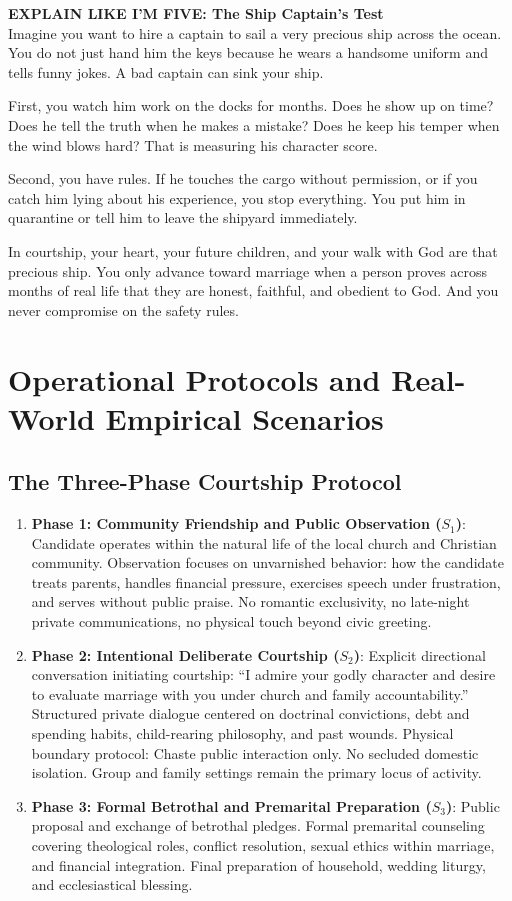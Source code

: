 \documentclass[11pt,twocolumn]{article}
\begin{document}
\begin{eli5box}
\textbf{EXPLAIN LIKE I'M FIVE: The Ship Captain's Test}\\
Imagine you want to hire a captain to sail a very precious ship across the ocean. You do not just hand him the keys because he wears a handsome uniform and tells funny jokes. A bad captain can sink your ship.

First, you watch him work on the docks for months. Does he show up on time? Does he tell the truth when he makes a mistake? Does he keep his temper when the wind blows hard? That is measuring his character score. 

Second, you have rules. If he touches the cargo without permission, or if you catch him lying about his experience, you stop everything. You put him in quarantine or tell him to leave the shipyard immediately. 

In courtship, your heart, your future children, and your walk with God are that precious ship. You only advance toward marriage when a person proves across months of real life that they are honest, faithful, and obedient to God. And you never compromise on the safety rules.
\end{eli5box}

\section{Operational Protocols and Real-World Empirical Scenarios}

\subsection{The Three-Phase Courtship Protocol}
\begin{enumerate}
    \item \textbf{Phase 1: Community Friendship and Public Observation ($S_1$)}: Candidate operates within the natural life of the local church and Christian community. Observation focuses on unvarnished behavior: how the candidate treats parents, handles financial pressure, exercises speech under frustration, and serves without public praise. No romantic exclusivity, no late-night private communications, no physical touch beyond civic greeting.
    \item \textbf{Phase 2: Intentional Deliberate Courtship ($S_2$)}: Explicit directional conversation initiating courtship: ``I admire your godly character and desire to evaluate marriage with you under church and family accountability.'' Structured private dialogue centered on doctrinal convictions, debt and spending habits, child-rearing philosophy, and past wounds. Physical boundary protocol: Chaste public interaction only. No secluded domestic isolation. Group and family settings remain the primary locus of activity.
    \item \textbf{Phase 3: Formal Betrothal and Premarital Preparation ($S_3$)}: Public proposal and exchange of betrothal pledges. Formal premarital counseling covering theological roles, conflict resolution, sexual ethics within marriage, and financial integration. Final preparation of household, wedding liturgy, and ecclesiastical blessing.
\end{enumerate}
\end{document}
